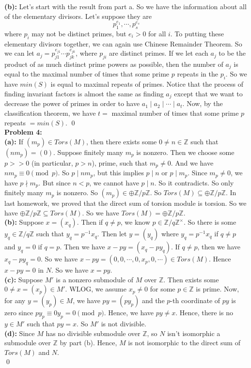 \documentclass[12pt]{amsart}
\newcommand{\Z}{\mathbb{Z}}
\begin{document}
\textbf{(b):} Let's start with the result from part a. So we have the information about all of the elementary divisors. Let's suppose they are 
\[p_1^{e_1},\cdots, p_s^{e_s}\]
where $p_i$ may not be distinct primes, but $e_i>0$ for all $i$. To putting these elementary divisors together, we can again use Chinese Remainder Theorem. So we can let $a_j=p_{j1}^{e_{j1}}\cdots p_{jk}^{e_{jk}}$, where $p_{ji}$ are distinct primes. If we let each $a_j$ to be the product of as much distinct prime powers as possible, then the number of $a_j$ is equal to the maximal number of times that some prime $p$ repeats in the $p_i$. So we have $min(S)$ is equal to maximal repeats of primes. Notice that the process of finding invariant factors is almost the same as finding $a_j$ except that we want to decrease the power of primes in order to have $a_1\mid a_2\mid \cdots\mid a_t$. Now, by the classification theorem, we have $t=$ maximal number of times that some prime $p$ repeats $=min(S)$.
\qed\\
\textbf{Problem 4:}\\
\textbf{(a):} If $(m_p)\in Tors(M)$, then there exists some $0\neq n\in \Z$ such that $(nm_p)=(0)$. Suppose finitely many $m_p$ is nonzero. Then we choose some $p>>0$ (in particular, $p>n$), prime, such that $m_p\neq 0$. And we have $nm_p\equiv 0 \pmod p$. So $p\mid nm_p$, but this implies $p\mid n$ or $p\mid m_p$. Since $m_p\neq 0$, we have $p\nmid m_p$. But since $n<p$, we cannot have $p\mid n$. So it contradicts. So only finitely many $m_p$ is nonzero. So $(m_p)\in \oplus \Z/p\Z$. So $Tors(M)\subseteq \oplus \Z/p\Z$. In last homework, we proved that the direct sum of torsion module is torsion. So we have $\oplus \Z/p\Z\subseteq Tors(M)$. So we have $Tors(M)=\oplus \Z/p\Z$.
\\
\textbf{(b):} Suppose $x=(x_q)$. Then if $q\neq p$, we know $p\in \Z/q\Z^\times$. So there is some $y_q\in \Z/q\Z$ such that $y_q=p^{-1}x_q$. Then let $y=(y_q)$ where $y_q=p^{-1}x_q$ if $q\neq p$ and $y_q=0$ if $q=p$. Then we have $x-py=(x_q-py_q)$. If $q\neq p$, then we have $x_q-py_q=0$. So we have $x-py=(0,0,\cdots,0,x_p,0,\cdots)\in Tors(M)$. Hence $x-py=0$ in $N$. So we have $x=py$.\\
\textbf{(c):} Suppose $M'$ is a nonzero submodule of $M$ over $\Z$. Then exists some $0\neq x=(x_p)\in M'$. WLOG, we assume $x_p\neq 0$ for some $p\in\Z$ is prime. Now, for any $y=(y_p)\in M$, we have $py=(py_p)$ and the $p$-th coordinate of $py$ is zero since $py_p\equiv 0y_p=0\pmod p$. Hence, we have $py\neq x$. Hence, there is no $y\in M'$ such that $py=x$. So $M'$ is not divisible.\\
\textbf{(d):} Since $M$ has no divisible submodule over $\Z$, so $N$ isn't isomorphic a submodule over $\Z$ by part (b). Hence, $M$ is not isomorphic to the direct sum of $Tors(M)$ and $N$.
\\\qed\\
\end{document}
